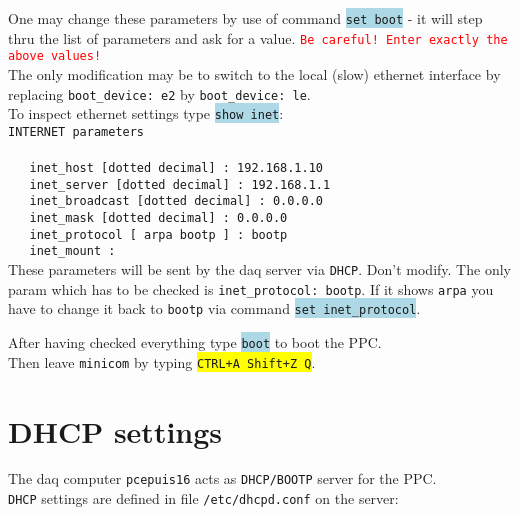 \documentclass[10pt]{article}
\newcommand{\blue}[1]{\colorbox{lightblue}{\texttt{#1}}}
\newcommand{\yellow}[1]{\colorbox{yellow}{\texttt{#1}}}
\newcommand{\redt}[1]{\textcolor{red}{\texttt{#1}}}
\begin{document}
One may change these parameters by use of command \blue{set boot} - it will step thru the list
of parameters and ask for a value. \redt{Be careful! Enter exactly the above values!}\\

The only modification may be to switch to the local (slow) ethernet interface by replacing \texttt{boot\_device:\,e2} by \texttt{boot\_device:\,le}.\\

To inspect ethernet settings type \blue{show inet}:\\

\verb+INTERNET parameters+\\\label{PPC-Inet}
\verb++\\
\verb+   inet_host [dotted decimal] : 192.168.1.10+\\
\verb+   inet_server [dotted decimal] : 192.168.1.1+\\
\verb+   inet_broadcast [dotted decimal] : 0.0.0.0+\\
\verb+   inet_mask [dotted decimal] : 0.0.0.0+\\
\verb+   inet_protocol [ arpa bootp ] : bootp+\\
\verb+   inet_mount :+\\

These parameters will be sent by the daq server via \texttt{DHCP}. Don't modify. The only param
which has to be checked is \texttt{inet\_protocol:\,bootp}. If it shows \texttt{arpa} you have to change it
back to \texttt{bootp} via command \blue{set inet\_protocol}.

After having checked everything type \blue{boot} to boot the PPC.\\
Then leave \texttt{minicom} by typing \yellow{CTRL+A Shift+Z Q}.

\newpage
\section{DHCP settings}
The daq computer \texttt{pcepuis16} acts as \texttt{DHCP/BOOTP} server for the PPC.\\

\texttt{DHCP} settings are defined in file \verb+/etc/dhcpd.conf+ on the server:\\
\end{document}

